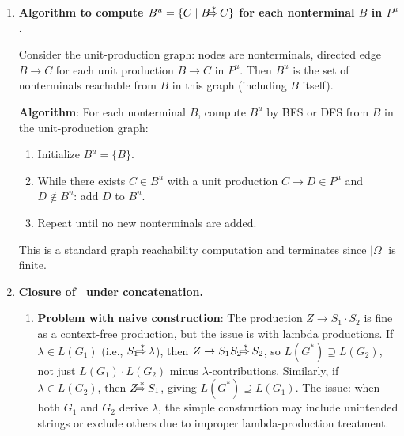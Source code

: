\begin{enumerate}[{9.}1. ]
\textbf{Lemma}: For each nonterminal $A$ and string $x$, the number of parse trees for $x$ derivable from $A$ is the same in $G$ as in the constructed unambiguous grammar $G'$.

\textbf{Proof}: By induction on $|x|$. Base case $|x|=0$: $A \DRightarrow \lambda$ iff $A \in N_\lambda$ (nullable nonterminals), and the construction handles this uniquely. Inductive step: use the structure of the production applied at the root of the parse tree. \qed

\item \textbf{Algorithm to compute $B^u = \{C \mid B \DRightarrow C\}$ for each nonterminal $B$ in $P^u$.}

Consider the unit-production graph: nodes are nonterminals, directed edge $B \to C$ for each unit production $B \to C$ in $P^u$. Then $B^u$ is the set of nonterminals reachable from $B$ in this graph (including $B$ itself).

\textbf{Algorithm}: For each nonterminal $B$, compute $B^u$ by BFS or DFS from $B$ in the unit-production graph:
\begin{enumerate}
\item Initialize $B^u = \{B\}$.
\item While there exists $C \in B^u$ with a unit production $C \to D \in P^u$ and $D \notin B^u$: add $D$ to $B^u$.
\item Repeat until no new nonterminals are added.
\end{enumerate}
This is a standard graph reachability computation and terminates since $|\Omega|$ is finite.

\item \textbf{Closure of \CSIG\ under concatenation.}

\begin{enumerate}
\item \textbf{Problem with naive construction}: The production $Z \to S_1 \cdot S_2$ is fine as a context-free production, but the issue is with lambda productions. If $\lambda \in L(G_1)$ (i.e., $S_1 \DRightarrow \lambda$), then $Z \to S_1 S_2 \DRightarrow S_2$, so $L(G^*) \supseteq L(G_2)$, not just $L(G_1)\cdot L(G_2)$ minus $\lambda$-contributions. Similarly, if $\lambda \in L(G_2)$, then $Z \DRightarrow S_1$, giving $L(G^*) \supseteq L(G_1)$. The issue: when both $G_1$ and $G_2$ derive $\lambda$, the simple construction may include unintended strings or exclude others due to improper lambda-production treatment.


\end{enumerate}
\end{enumerate}
